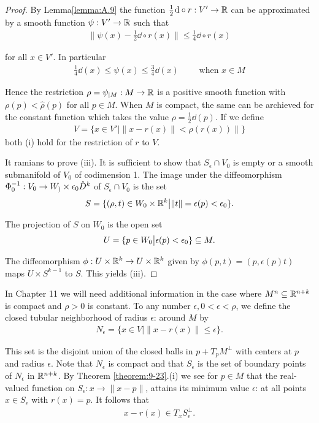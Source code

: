 \begin{proof}
By Lemma\ref{lemma:A.9} the function $\frac12\dd\circ r: V'\to \RR$ can be approximated by a smooth 
function $\psi:V'\to \mathbb{R}$ such that 
\begin{align*}
  \|\psi(x) - \frac12\dd\circ r(x)\| \le \frac14\dd\circ r(x)
\end{align*}

for all $x\in V'$. In particular
\begin{align*}
  \frac{1}{4}\dd(x)\le \psi(x)\le \frac34\dd(x)\qquad \text{ when } x\in M
\end{align*}

Hence the restriction $\rho = \psi_{|M}:M\to\mathbb{R}$ is a positive smooth function with 
$\rho(p)<\hat{\rho}(p)$ for all $p\in M$. When $M$ is compact, the same can be archieved 
for the constant function which takes the value $\rho =\frac12\dd(p)$. If we define 
\begin{align*}
  V = \{x\in V'\big| \|x-r(x)\|<\rho(r(x))\|\}
\end{align*}
both (i) hold for the restriction of $r$ to $V$.

It ramians to prove (iii). It is sufficient to show that $S_\epsilon\cap V_0$ is empty 
or a smooth submanifold of $V_0$ of codimension 1. The image under the diffeomorphism 
$\Phi_0^{-1}:V_0\to W_)\times \epsilon_0\mathring{D}^k$ of $S_\epsilon\cap V_0$ is the set 
\begin{align*}
  S = \{(\rho, t)\in W_0\times \mathbb{R}^k \big| \|t\|=\epsilon(p)<\epsilon_0\}.
\end{align*}

The projection of $S$ on $W_0$ is the open set 
\begin{align*}
  U = \{p\in W_0\big| \epsilon(p)<\epsilon_0\}\subseteq M.
\end{align*}

The diffeomorphism $\phi:U\times\mathbb{R}^k\to U\times\mathbb{R}^k$ given by $\phi(p, t) = (p, \epsilon(p)t)$
maps $U\times S^{k-1}$ to $S$. This yields (iii).
\end{proof}

\begin{remark}\label{remark:9-24}
  In Chapter 11 we will need additional information in the case where
$M^n\subseteq\mathbb{R}^{n+k}$ is compact and $\rho>0$ is constant. To any number $\epsilon, 0<\epsilon<\rho$, 
we define the closed tubular neighborhood of radius $\epsilon$: around $M$ by
\begin{align*}
  N_\epsilon = \{x\in V\big| \|x-r(x)\|\le \epsilon\}.
\end{align*}

This set is the disjoint union of the closed balls in $p+T_pM^\perp$ with centers at $p$ and
radius $\epsilon$. Note that $N_\epsilon$ is compact and that $S_\epsilon$ is the set of boundary 
points of $N_\epsilon$ in $\mathbb{R}^{n+k}$. By Theorem \ref{theorem:9-23}.(i) we see for $p\in M$ that 
the real-valued function on $S_\epsilon:x\to\|x-p\|$, attains its minimum value $\epsilon$: at all 
points $x\in S_\epsilon$ with $r(x) = p$. It follows that
\begin{align}\label{eq:9-21}
  x -r(x)\in T_xS_\epsilon^\perp.
\end{align}
\end{remark}


